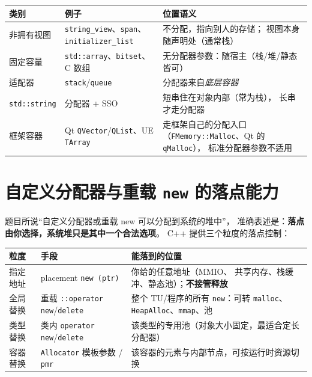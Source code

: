 \documentclass[12pt,a4paper,fontset=fandol]{ctexbook}
\begin{document}
\begin{longtable}{@{}>{\raggedright\arraybackslash}p{}>{\raggedright\arraybackslash}p{}>{\raggedright\arraybackslash}p{}@{}}
\toprule
\textbf{类别} & \textbf{例子} & \textbf{位置语义} \\
\midrule
非拥有视图 & \texttt{string\_view}、\texttt{span}、
  \texttt{initializer\_list} & 不分配，指向别人的存储；
  视图本身随声明处（通常栈） \\
\addlinespace
固定容量 & \texttt{std::array}、\texttt{bitset}、
  C 数组 & 无分配器参数：随宿主（栈/堆/静态皆可） \\
\addlinespace
适配器 & \texttt{stack}/\allowbreak{}\texttt{queue} & 分配器来自\emph{底层容器} \\
\addlinespace
\texttt{std::string} & 分配器 + SSO & 短串住在对象内部（常为栈），
  长串才走分配器 \\
\addlinespace
框架容器 & Qt \texttt{QVector}/\allowbreak{}\texttt{QList}、UE \texttt{TArray} &
  走框架自己的分配入口（\texttt{FMemory::Malloc}、Qt 的 \texttt{qMalloc}），
  标准分配器参数不适用 \\
\bottomrule
\end{longtable}

\section{自定义分配器与重载 \texttt{new} 的落点能力}

题目所说``自定义分配器或重载 new 可以分配到系统的堆中''，
准确表述是：\textbf{落点由你选择，系统堆只是其中一个合法选项}。
C++ 提供三个粒度的落点控制：

\begin{longtable}{@{}>{\raggedright\arraybackslash}p{}>{\raggedright\arraybackslash}p{}>{\raggedright\arraybackslash}p{}@{}}
\toprule
\textbf{粒度} & \textbf{手段} & \textbf{能落到的位置} \\
\midrule
指定地址 & placement \texttt{new (ptr)} & 你给的任意地址（MMIO、
  共享内存、栈缓冲、静态池）；\textbf{不接管释放} \\
\addlinespace
全局替换 & 重载 \texttt{::operator new}/\allowbreak{}\texttt{delete} &
  整个 TU/程序的所有 \texttt{new}：可转 \texttt{malloc}、
  \texttt{HeapAlloc}、\texttt{mmap}、池 \\
\addlinespace
类型替换 & 类内 \texttt{operator new}/\allowbreak{}\texttt{delete} &
  该类型的专用池（对象大小固定，最适合定长分配器） \\
\addlinespace
容器替换 & \texttt{Allocator} 模板参数 / \texttt{pmr} &
  该容器的元素与内部节点，可按运行时资源切换 \\
\bottomrule
\end{longtable}
\end{document}
